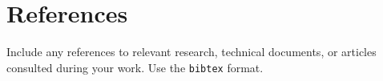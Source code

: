 \chapter{References}
Include any references to relevant research, technical documents, or articles consulted during your work. Use the \texttt{bibtex} format.